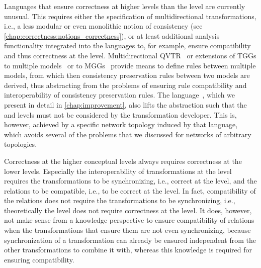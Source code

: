 Languages that ensure correctness at higher levels than the \leveltransformation level are currently unusual.
This requires either the specification of multidirectional transformations, i.e., a less modular or even monolithic notion of consistency (see \autoref{chap:correctness:notions_correctness}), or at least additional analysis functionality integrated into the languages to, for example, ensure compatibility and thus correctness at the \levelnetworkrule level.
Multidirectional \gls{QVTR}~\cite{macedo2014FrameworkMultiDirectional-BX} or extensions of \glspl{TGG} to multiple models~\cite{trollmann2015TransformationTGGtoMultiModel-ICMT,trollmann2016SynchronizationTGGtoMultiModel-ICMT} or to \glspl{MGG}~\cite{konigs2006MGGs-sosym} provide means to define rules between multiple models, from which then consistency preservation rules between two models are derived, thus abstracting from the problems of ensuring rule compatibility and interoperability of consistency  preservation rules.
The \commonalities language~\cite{gleitze2017a}, which we present in detail in \autoref{chap:improvement}, also lifts the abstraction such that the \levelnetworkrelation and \levelnetworkrule levels must not be considered by the transformation developer.
This is, however, achieved by a specific network topology induced by that language, which avoids several of the problems that we discussed for networks of arbitrary topologies.

Correctness at the higher conceptual levels always requires correctness at the lower levels.
Especially the interoperability of transformations at the \levelnetworkrule level requires the transformations to be synchronizing, i.e., correct at the \leveltransformation level, and the relations to be compatible, i.e., to be correct at the \levelnetworkrelation level.
In fact, compatibility of the relations does not require the transformations to be synchronizing, i.e., theoretically the \levelnetworkrelation level does not require correctness at the \leveltransformation level.
It does, however, not make sense from a knowledge perspective to ensure compatibility of relations when the transformations that ensure them are not even synchronizing, because synchronization of a transformation can already be ensured independent from the other transformations to combine it with, whereas this knowledge is required for ensuring compatibility.

